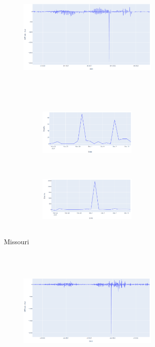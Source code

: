 \documentclass[11pt,twocolumn,letterpaper]{article}
\begin{document}
\begin{figure}
\begin{subfigure}{0.48\linewidth}
\begin{subfigure}{0.48\linewidth}
        \centering
        \includegraphics[width=\linewidth, height=6.3cm]{images/mo_overview.PNG}
    \end{subfigure}
    \hfill
    \begin{subfigure}{0.48\linewidth}
        \begin{subfigure}{\linewidth}
            \centering
            \includegraphics[width=\linewidth, height=3.15cm]{images/mo_cdc.PNG}
            \vfill
        \end{subfigure}
        \begin{subfigure}{\linewidth}
            \centering
            \includegraphics[width=\linewidth, height=3.15cm]{images/mo_jhu.PNG}
            \vfill
        \end{subfigure}
    \end{subfigure}
    \caption{Missouri}
\end{subfigure}
\hfill
\begin{subfigure}{0.48\linewidth}
    \begin{subfigure}{0.48\linewidth}
        \centering
        \includegraphics[width=\linewidth, height=6.3cm]{images/tn_overview.PNG}

\end{subfigure}
\end{subfigure}
\end{figure}
\end{document}
